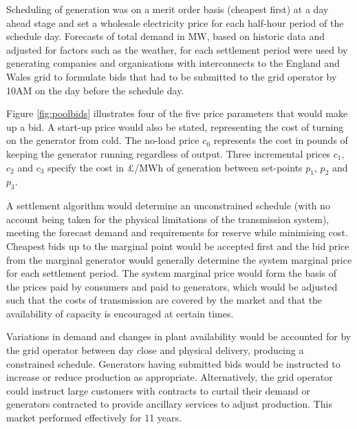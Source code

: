 Scheduling of generation was on a merit order basis (cheapest first) at a day
ahead stage and set a wholesale electricity price for each half-hour period of
the schedule day.  Forecasts of total demand in MW, based on historic data and
adjusted for factors such as the weather, for each settlement period were used
by generating companies and organisations with interconnects to the England
and Wales grid to formulate bids that had to be submitted to the grid operator
by 10AM on the day before the schedule day.


Figure \ref{fig:poolbids} illustrates four of the five price parameters that
would make up a bid.  A start-up price would also be stated, representing the
cost of turning on the generator from cold.  The no-load price $c_{0}$
represents the cost in pounds of keeping the generator running regardless of
output. Three incremental prices $c_1$, $c_2$ and $c_3$ specify the cost in
\pounds/MWh of generation between set-points $p_1$, $p_2$ and $p_3$.

A settlement algorithm would determine an unconstrained schedule (with no
account being taken for the physical limitations of the transmission system),
meeting the forecast demand and requirements for reserve while minimising cost.
Cheapest bids up to the marginal point would be accepted first and the bid price
from the marginal generator would generally determine the system marginal price
for each settlement period.  The system marginal price would form the basis of
the prices paid by consumers and paid to generators, which would be adjusted
such that the costs of transmission are covered by the market and that the
availability of capacity is encouraged at certain times.

Variations in demand and changes in plant availability would be accounted for by
the grid operator between day close and physical delivery, producing a
constrained schedule. Generators having submitted bids would be instructed to
increase or reduce production as appropriate.  Alternatively, the grid operator
could instruct large customers with contracts to curtail their demand
or generators contracted to provide ancillary services to adjust production.
This market performed effectively for 11 years.

